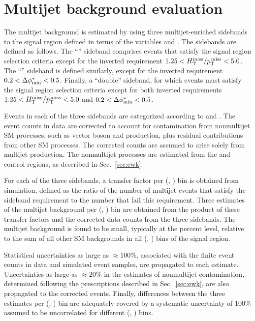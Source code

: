 
\clearpage
\section{Multijet background evaluation}
\label{sec:qcd}

The multijet background is estimated by using three multijet-enriched
sidebands to the signal region defined in terms of the variables
\mhtmet and \bdphi. The sidebands are defined as follows. The
``\mhtmet'' sideband comprises events that satisfy the signal region
selection criteria except for the inverted requirement $1.25 < H_{\text{T}}^{\text{miss}} / p_{\text{T}}^{\kern1pt\text{miss}}
< 5.0$. The ``\bdphi'' sideband is defined similarly, except for the
inverted requirement $0.2 < \Delta\phi^{*}_\text{min} < 0.5$. Finally, a ``double''
sideband, for which events must satisfy the signal region selection
criteria except for both inverted requirements $1.25 < H_{\text{T}}^{\text{miss}} / p_{\text{T}}^{\kern1pt\text{miss}} < 5.0$
and $0.2 < \Delta\phi^{*}_\text{min} < 0.5$.

Events in each of the three sidebands are categorized according to
\njet and \scalht. The event counts in data are corrected to account
for contamination from nonmultijet SM processes, such as vector boson
and \ttbar production, plus residual contributions from other SM
processes. The corrected counts are assumed to arise solely from
multijet production. The nonmultijet processes are estimated from the
\mj and \mmj control regions, as described in Sec.~\ref{sec:ewk}.

For each of the three sidebands, a transfer factor per (\njet,
\scalht) bin is obtained from simulation, defined as the ratio of the
number of multijet events that satisfy the sideband requirement to the
number that fail this requirement. Three estimates of the multijet
background per (\njet, \scalht) bin are obtained from the product of
these transfer factors and the corrected data counts from the three
sidebands. The multijet background is found to be small, typically at
the percent level, relative to the sum of all other SM backgrounds in
all (\njet, \nb) bins of the signal region.

Statistical uncertainties as large as ${\approx}100\%$, associated
with the finite event counts in data and simulated event samples, are
propagated to each estimate. Uncertainties as large as ${\approx}20\%$
in the estimates of nonmultijet contamination, determined following
the prescriptions described in Sec.~\ref{sec:ewk}, are also propagated
to the corrected events. Finally, differences between the three
estimates per (\njet, \scalht) bin are adequately covered by a
systematic uncertainty of 100\% assumed to be uncorrelated for
different (\njet, \scalht) bins.

